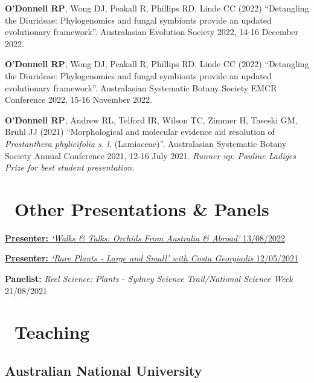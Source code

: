 \documentclass[10,a4paper,]{awesome-cv}
\begin{document}
\textbf{O'Donnell RP}, Wong DJ, Peakall R, Phillips RD, Linde CC (2022)
``Detangling the Diurideae: Phylogenomics and fungal symbionts provide
an updated evolutionary framework''. Australasian Evolution Society
2022, 14-16 December 2022.

\textbf{O'Donnell RP}, Wong DJ, Peakall R, Phillips RD, Linde CC (2022)
``Detangling the Diurideae: Phylogenomics and fungal symbionts provide
an updated evolutionary framework''. Australasian Systematic Botany
Society EMCR Conference 2022, 15-16 November 2022.

\textbf{O'Donnell RP}, Andrew RL, Telford IR, Wilson TC, Zimmer H,
Taseski GM, Bruhl JJ (2021) ``Morphological and molecular evidence aid
resolution of \emph{Prostanthera phylicifolia s. l.} (Lamiaceae)''.
Australasian Systematic Botany Society Annual Conference 2021, 12-16
July 2021. \emph{Runner up: Pauline Ladiges Prize for best student
presentation.}

\hypertarget{other-presentations-panels}{%
\section{\texorpdfstring{\acvHeaderIconSep~Other
Presentations \&
Panels}{~Other Presentations \& Panels}}\label{other-presentations-panels}}

\href{https://www.instagram.com/p/ChLqF9UuGza}{\textbf{Presenter:}
\emph{`Walks \& Talks: Orchids From Australia \& Abroad'} 13/08/2022}

\href{https://www.facebook.com/CostasWorld/videos/491418699340504/}{\textbf{Presenter:}
\emph{`Rare Plants - Large and Small' with Costa Georgiadis} 12/05/2021}

\textbf{Panelist:} \emph{Reel Science: Plants - Sydney Science
Trail/National Science Week} 21/08/2021

\hypertarget{teaching}{%
\section{\texorpdfstring{\acvHeaderIconSep~Teaching}{~Teaching}}\label{teaching}}

\hypertarget{australian-national-university}{%
\subsection{Australian National
University}\label{australian-national-university}}

\begin{cvhonors}
\end{cvhonors}
\end{document}
